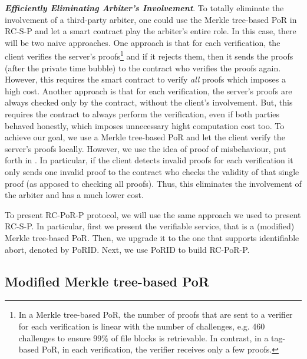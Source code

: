\noindent\textit{\textbf{Efficiently Eliminating Arbiter's Involvement}}. To totally eliminate the involvement of a third-party arbiter, one could use the Merkle tree-based PoR in RC-S-P and let a smart contract play the arbiter's entire role. In this case, there will be two  naive approaches.  One approach is that for each verification, the client verifies the server's proofs\footnote{In a Merkle tree-based PoR, the number of proofs that are sent to a verifier for each verification is linear with the number of challenges, e.g. 460 challenges  to ensure 99\% of file blocks is retrievable. In contrast, in a tag-based PoR, in each verification, the verifier receives only a few proofs.} and if it rejects them, then it sends the proofs (after the private time bubble)  to the contract who verifies the proofs again. However, this requires the smart contract to verify \emph{all} proofs which imposes a high cost. Another approach is that for each verification, the server's proofs  are always checked only by the contract, without the client's involvement. But, this requires the contract to always perform the verification, even if both parties  behaved honestly, which imposes unnecessary hight computation cost too. To  achieve our goal, we use a Merkle tree-based PoR  and let the client  verify the server's proofs locally. However, we use the idea of proof of misbehaviour, put forth in \cite{}. In particular, if the client detects invalid proofs for each verification  it only sends one invalid proof to the contract  who  checks the validity of that single proof (as apposed to checking all proofs). Thus, this eliminates the involvement of the arbiter and has a much lower cost. 



To present RC-PoR-P protocol, we will use the same approach we used to present RC-S-P. In particular, first we present the verifiable service, that is a (modified) Merkle tree-based PoR. Then, we upgrade it to the one that supports  identifiable abort, denoted by PoRID. Next,   we use PoRID to build RC-PoR-P. 

\subsection{Modified Merkle tree-based PoR}\label{protocol::PoR}

